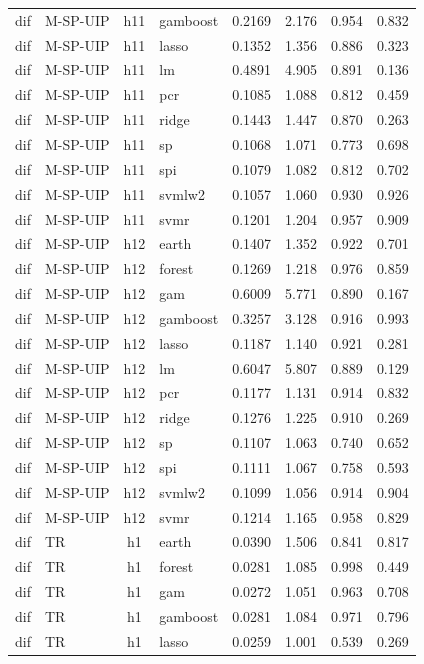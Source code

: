 \begin{ThreePartTable}
\begin{longtable}[t]{llclcccc}
dif & M-SP-UIP & h11 & gamboost & 0.2169 & 2.176 & 0.954 & 0.832\\
dif & M-SP-UIP & h11 & lasso & 0.1352 & 1.356 & 0.886 & 0.323\\
dif & M-SP-UIP & h11 & lm & 0.4891 & 4.905 & 0.891 & 0.136\\
dif & M-SP-UIP & h11 & pcr & 0.1085 & 1.088 & 0.812 & 0.459\\
dif & M-SP-UIP & h11 & ridge & 0.1443 & 1.447 & 0.870 & 0.263\\
dif & M-SP-UIP & h11 & sp & 0.1068 & 1.071 & 0.773 & 0.698\\
dif & M-SP-UIP & h11 & spi & 0.1079 & 1.082 & 0.812 & 0.702\\
dif & M-SP-UIP & h11 & svmlw2 & 0.1057 & 1.060 & 0.930 & 0.926\\
dif & M-SP-UIP & h11 & svmr & 0.1201 & 1.204 & 0.957 & 0.909\\
\addlinespace
dif & M-SP-UIP & h12 & earth & 0.1407 & 1.352 & 0.922 & 0.701\\
dif & M-SP-UIP & h12 & forest & 0.1269 & 1.218 & 0.976 & 0.859\\
dif & M-SP-UIP & h12 & gam & 0.6009 & 5.771 & 0.890 & 0.167\\
dif & M-SP-UIP & h12 & gamboost & 0.3257 & 3.128 & 0.916 & 0.993\\
dif & M-SP-UIP & h12 & lasso & 0.1187 & 1.140 & 0.921 & 0.281\\
dif & M-SP-UIP & h12 & lm & 0.6047 & 5.807 & 0.889 & 0.129\\
dif & M-SP-UIP & h12 & pcr & 0.1177 & 1.131 & 0.914 & 0.832\\
dif & M-SP-UIP & h12 & ridge & 0.1276 & 1.225 & 0.910 & 0.269\\
dif & M-SP-UIP & h12 & sp & 0.1107 & 1.063 & 0.740 & 0.652\\
dif & M-SP-UIP & h12 & spi & 0.1111 & 1.067 & 0.758 & 0.593\\
dif & M-SP-UIP & h12 & svmlw2 & 0.1099 & 1.056 & 0.914 & 0.904\\
dif & M-SP-UIP & h12 & svmr & 0.1214 & 1.165 & 0.958 & 0.829\\
\addlinespace
dif & TR & h1 & earth & 0.0390 & 1.506 & 0.841 & 0.817\\
dif & TR & h1 & forest & 0.0281 & 1.085 & 0.998 & 0.449\\
dif & TR & h1 & gam & 0.0272 & 1.051 & 0.963 & 0.708\\
dif & TR & h1 & gamboost & 0.0281 & 1.084 & 0.971 & 0.796\\
dif & TR & h1 & lasso & 0.0259 & 1.001 & 0.539 & 0.269\\

\end{longtable}
\end{ThreePartTable}
